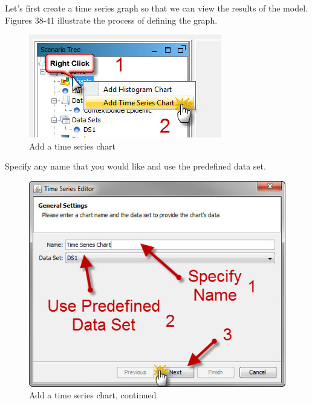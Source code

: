 \documentclass[11pt]{amsart}
\begin{document}
Let’s first create a time series graph so that we can view the results of the model. Figures 38-41 illustrate the process of defining the graph.


\begin{figure}[ht]
\begin{center}
\vspace{.2in}
\centerline {
\includegraphics[totalheight=0.3\textheight]{images/036.jpg}
}
\caption{Add a time series chart}
\label{fig:036}
\end{center}
\end{figure}

Specify any name that you would like and use the predefined data set.


\begin{figure}[ht]
\begin{center}
\vspace{.2in}
\centerline {
\includegraphics[totalheight=0.3\textheight]{images/037.jpg}
}
\caption{Add a time series chart, continued}
\label{fig:037}
\end{center}
\end{figure}
\end{document}
